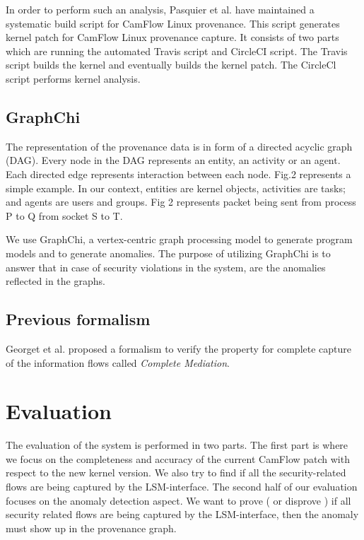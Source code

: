 \documentclass{IEEEtran}
\begin{document}
In order to perform such an analysis,  Pasquier et al. have maintained a systematic build script for CamFlow Linux provenance.  This script generates kernel patch for CamFlow Linux provenance capture. It consists of two parts which are running the automated Travis script and  CircleCI script.  The Travis script builds the kernel and eventually builds the kernel patch. The CircleCl script performs kernel analysis.

\subsection{GraphChi}

The representation of the provenance data is in form of a directed acyclic graph (DAG). Every node in the DAG represents an entity, an activity or an agent. Each directed edge represents interaction between each node. Fig.2 represents a simple example. In our context, entities are kernel objects, activities are tasks; and agents are users and groups. Fig 2 represents packet being sent from process P to Q from socket S to T. 

We use GraphChi, a vertex-centric graph processing model to generate program models and to generate anomalies. The purpose of utilizing GraphChi is to answer that in case of security violations in the system, are the anomalies reflected in the graphs. 


\subsection{Previous formalism}

Georget et al. \cite{b3} proposed a formalism to verify the property for complete capture of the information flows called \textit{Complete Mediation}. 





\section{Evaluation}

The evaluation of the system is performed in two parts. The first part is where we focus on the completeness and accuracy of the current CamFlow patch with respect to the new kernel version. We also try to find if all the security-related flows are being captured by the LSM-interface. The second half of our evaluation focuses on the anomaly detection aspect. We want to prove ( or disprove ) if all security related flows are being captured by the LSM-interface, then the anomaly must show up in the provenance graph.
\end{document}
